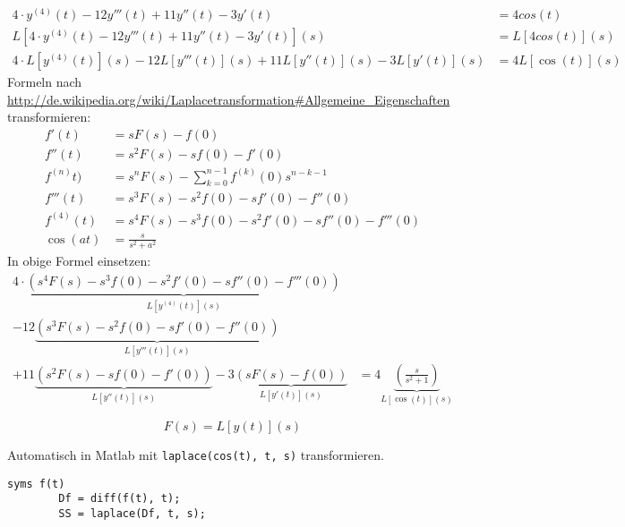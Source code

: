 \documentclass[%
	paper=a4,%
	pagesize=auto	%
	]{scrartcl}
\begin{document}
\begin{align*}
	4 \cdot y^{(4)}(t) - 12 y'''(t) + 11 y''(t) - 3 y'(t)
		& = 4 cos(t)\\
	L\left[4 \cdot y^{(4)}(t) - 12 y'''(t) + 11 y''(t) - 3 y'(t)\right](s)
		& = L\left[4 cos(t)\right](s)\\
	4 \cdot L\left[y^{(4)}(t)\right](s)
		- 12 L\left[y'''(t)\right](s)
		+ 11 L\left[y''(t)\right](s)
		- 3 L\left[y'(t)\right](s)
		& = 4 L\left[\cos(t)\right](s)
\end{align*}
Formeln nach \url{http://de.wikipedia.org/wiki/Laplacetransformation#Allgemeine_Eigenschaften} transformieren:
\begin{align*}
	f'(t)	& = s F(s) - f(0)\\
	f''(t)	& = s^2 F(s) - sf(0) - f'(0)\\
	f^{(n)}t)
		& = s^n F(s) - \sum\limits_{k=0}^{n-1} f^{(k)}(0) s^{n-k-1}\\
	f'''(t)	& = s^3 F(s) - s^2 f(0) - sf'(0) - f''(0)\\
	f^{(4)}(t)	& = s^4 F(s) -s^3 f(0) - s^2 f'(0) - sf''(0) - f'''(0)\\
	\cos(at) & = \frac{s}{s^2+a^2}
\end{align*}
In obige Formel einsetzen:
\begin{align*}
	4 \cdot \underbrace{\left(s^4 F(s) -s^3 f(0) - s^2 f'(0) - sf''(0) - f'''(0)\right)}_{L\left[y^{(4)}(t)\right](s)}\\
		- 12 \underbrace{\left(s^3 F(s) - s^2 f(0) - sf'(0) - f''(0)\right)}_{L\left[y'''(t)\right](s)}\\
		+ 11 \underbrace{\left(s^2 F(s) - sf(0) - f'(0)\right)}_{L\left[y''(t)\right](s)}
		- 3 \underbrace{\left(s F(s) - f(0)\right)}_{L\left[y'(t)\right](s)}
		& = 4 \underbrace{\left(\frac{s}{s^2 + 1}\right)}_{L\left[\cos(t)\right](s)}
\end{align*}
	
	\[F(s) = L\left[y(t)\right](s)\]

	Automatisch in Matlab mit \lstinline=laplace(cos(t), t, s)= transformieren.

	\begin{lstlisting}[gobble=16]
		syms f(t)
		Df = diff(f(t), t);
		SS = laplace(Df, t, s);
	\end{lstlisting}
\end{document}
